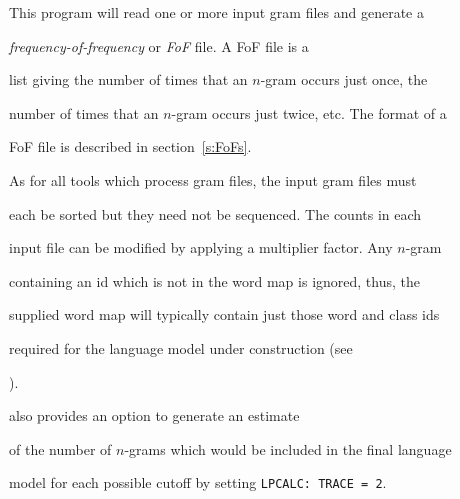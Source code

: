 %




%




%





\newpage














This program will read one or more input gram files and generate a


\textit{frequency-of-frequency} or \textit{FoF} file. A FoF file is a


list giving the number of times that an $n$-gram occurs just once, the


number of times that an $n$-gram occurs just twice, etc. The format of a


FoF file is described in section~\ref{s:FoFs}.





As for all tools which process gram files, the input gram files must


each be sorted but they need not be sequenced. The counts in each


input file can be modified by applying a multiplier factor.  Any $n$-gram


containing an id which is not in the word map is ignored, thus, the


supplied word map will typically contain just those word and class ids


required for the language model under construction (see


).





 also provides an option to generate an estimate


of the number of $n$-grams which would be included in the final language


model for each possible cutoff by setting \texttt{LPCALC: TRACE = 2}.





